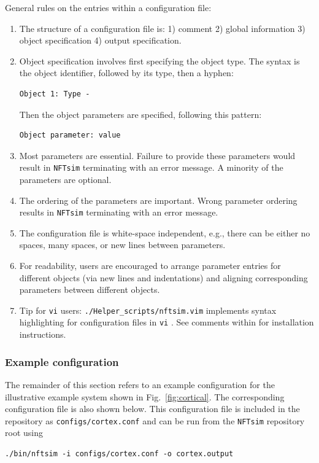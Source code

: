 \documentclass[12pt,a4paper]{article}
\newcommand{\type}[1]{{\small\small\tt #1} }
\newcommand{\NF}[0]{\type{NFTsim}}
\begin{document}
General rules on the entries within a configuration file:

\begin{enumerate}
    \item The structure of a configuration file is: 1) comment 2) global information 3) object specification 4) output specification.
    \item Object specification involves first specifying the object type. The syntax is the object identifier, followed by its type, then a hyphen:
        \begin{lstlisting}
Object 1: Type -
        \end{lstlisting}
        Then the object parameters are specified, following this pattern:
        \begin{lstlisting}
Object parameter: value
        \end{lstlisting}
    \item Most parameters are essential. Failure to provide these parameters would result in \NF terminating with an error message. A minority of the parameters are optional.
    \item The ordering of the parameters are important. Wrong parameter ordering results in \NF terminating with an error message.
    \item The configuration file is white-space independent, e.g., there can be either no spaces, many spaces, or new lines between parameters.
    \item For readability, users are encouraged to arrange parameter entries for different objects (via new lines and indentations) and aligning corresponding parameters between different objects.
    \item Tip for \type{vi} users: \type{./Helper\_scripts/nftsim.vim} implements syntax highlighting for configuration files in \type{vi}. See comments within for installation instructions.
\end{enumerate}

\subsubsection{Example configuration}
The remainder of this section refers to an example configuration for the illustrative example system shown in Fig.~\ref{fig:cortical}. The corresponding configuration file is also shown below. This configuration file is included in the repository as \type{configs/cortex.conf} and can be run from the \NF repository root using

\begin{lstlisting}
./bin/nftsim -i configs/cortex.conf -o cortex.output
\end{lstlisting}
\end{document}
